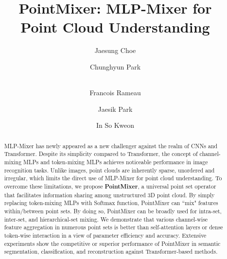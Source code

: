 \pagestyle{headings}
\mainmatter
\def\ECCVSubNumber{4588}

\title{PointMixer: MLP-Mixer for \\Point Cloud Understanding}





\author{
Jaesung Choe \and 
Chunghyun Park \and \\ 
Francois Rameau \and 
Jaesik Park \and 
In So Kweon
}

\maketitle

\vspace{-4mm}
\begin{abstract}
MLP-Mixer has newly appeared as a new challenger against the realm of CNNs and Transformer. Despite its simplicity compared to Transformer, the concept of channel-mixing MLPs and token-mixing MLPs achieves noticeable performance in image recognition tasks. Unlike images, point clouds are inherently sparse, unordered and irregular, which limits the direct use of MLP-Mixer for point cloud understanding. To overcome these limitations, we propose \textbf{PointMixer}, a universal point set operator that facilitates information sharing among unstructured 3D point cloud. By simply replacing token-mixing MLPs with Softmax function, PointMixer can ``mix" features within/between point sets. By doing so, PointMixer can be broadly used for intra-set, inter-set, and hierarchical-set mixing. We demonstrate that various channel-wise feature aggregation in numerous point sets is better than self-attention layers or dense token-wise interaction in a view of parameter efficiency and accuracy. Extensive experiments show the competitive or superior performance of PointMixer in semantic segmentation, classification, and reconstruction against Transformer-based methods. 


%
 \end{abstract}

